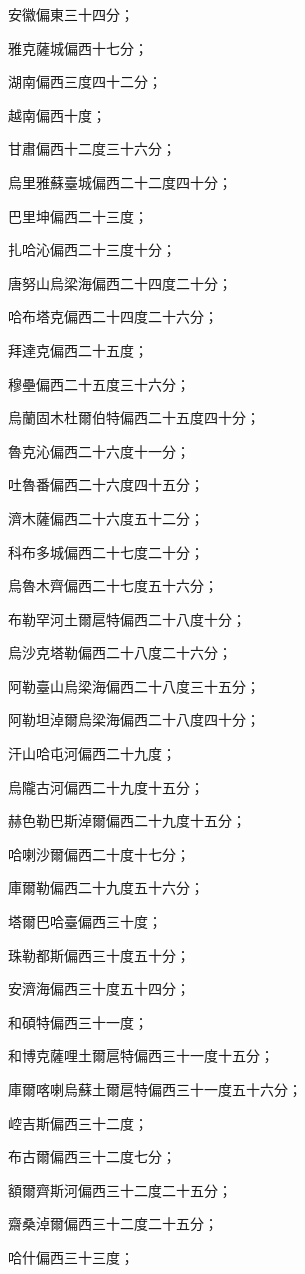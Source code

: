 \begin{pinyinscope}
安徽偏東三十四分；

雅克薩城偏西十七分；

湖南偏西三度四十二分；

越南偏西十度；

甘肅偏西十二度三十六分；

烏里雅蘇臺城偏西二十二度四十分；

巴里坤偏西二十三度；

扎哈沁偏西二十三度十分；

唐努山烏梁海偏西二十四度二十分；

哈布塔克偏西二十四度二十六分；

拜達克偏西二十五度；

穆壘偏西二十五度三十六分；

烏蘭固木杜爾伯特偏西二十五度四十分；

魯克沁偏西二十六度十一分；

吐魯番偏西二十六度四十五分；

濟木薩偏西二十六度五十二分；

科布多城偏西二十七度二十分；

烏魯木齊偏西二十七度五十六分；

布勒罕河土爾扈特偏西二十八度十分；

烏沙克塔勒偏西二十八度二十六分；

阿勒臺山烏梁海偏西二十八度三十五分；

阿勒坦淖爾烏梁海偏西二十八度四十分；

汗山哈屯河偏西二十九度；

烏隴古河偏西二十九度十五分；

赫色勒巴斯淖爾偏西二十九度十五分；

哈喇沙爾偏西二十度十七分；

庫爾勒偏西二十九度五十六分；

塔爾巴哈臺偏西三十度；

珠勒都斯偏西三十度五十分；

安濟海偏西三十度五十四分；

和碩特偏西三十一度；

和博克薩哩土爾扈特偏西三十一度十五分；

庫爾喀喇烏蘇土爾扈特偏西三十一度五十六分；

崆吉斯偏西三十二度；

布古爾偏西三十二度七分；

額爾齊斯河偏西三十二度二十五分；

齋桑淖爾偏西三十二度二十五分；

哈什偏西三十三度；


\end{pinyinscope}
